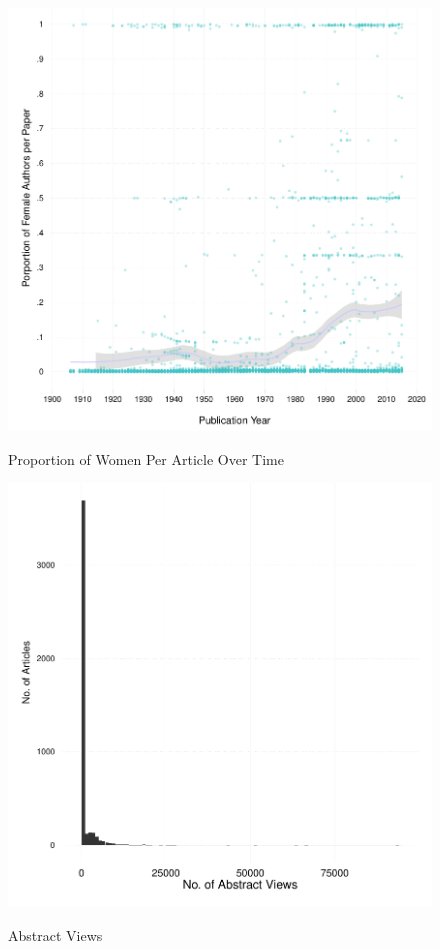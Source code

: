 \documentclass[11pt]{article}
\begin{document}
\begin{figure}[htbp]
\centering
\caption{Proportion of Women Per Article Over Time}
\includegraphics[scale=.85]{../figs/gender_authors_per_article_over_time.pdf}
\label{fig:women}
\end{figure}

\begin{figure}[htbp]
\centering
\caption{Abstract Views}
\includegraphics[scale=.85]{../figs/abstract_views.pdf}
\label{fig:abstracts}
\end{figure}
\end{document}
